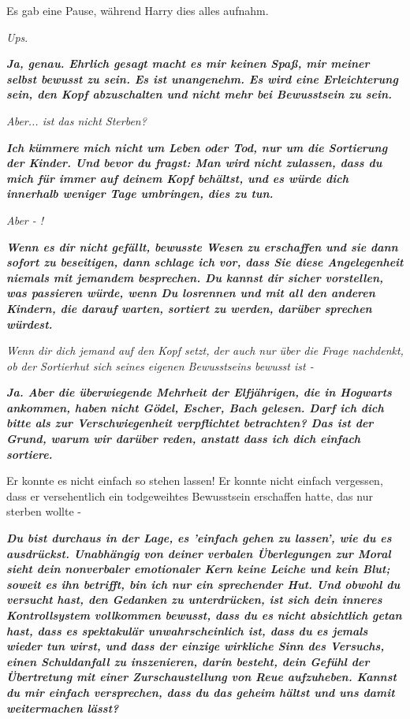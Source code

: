 Es gab eine Pause, während Harry dies alles aufnahm.

\emph{Ups}.

\textbf{\emph{\glqq{}Ja, genau. Ehrlich gesagt macht es mir keinen Spaß, mir
meiner selbst bewusst zu sein. Es ist unangenehm. Es wird eine Erleichterung
sein, den Kopf abzuschalten und nicht mehr bei Bewusstsein zu sein.\grqq{}}}

\emph{Aber... ist das nicht Sterben?}

\textbf{\emph{\glqq{}Ich kümmere mich nicht um Leben oder Tod, nur um die
Sortierung der Kinder. Und bevor du fragst: Man wird nicht zulassen, dass du
mich für immer auf deinem Kopf behältst, und es würde dich innerhalb weniger
Tage umbringen, dies zu tun.\grqq{}}}

\emph{Aber - !}

\textbf{\emph{\glqq{}Wenn es dir nicht gefällt, bewusste Wesen zu erschaffen und
sie dann sofort zu beseitigen, dann schlage ich vor, dass Sie diese
Angelegenheit niemals mit jemandem besprechen. Du kannst dir sicher vorstellen,
was passieren würde, wenn Du losrennen und mit all den anderen Kindern, die
darauf warten, sortiert zu werden, darüber sprechen würdest.\grqq{}}}

\emph{Wenn dir dich jemand auf den Kopf setzt, der auch nur über die Frage
nachdenkt, ob der Sortierhut sich seines eigenen Bewusstseins bewusst ist -}

\textbf{\emph{\glqq{}Ja. Aber die überwiegende Mehrheit der Elfjährigen, die in
Hogwarts ankommen, haben nicht Gödel, Escher, Bach gelesen. Darf ich dich bitte
als zur Verschwiegenheit verpflichtet betrachten? Das ist der Grund, warum wir
darüber reden, anstatt dass ich dich einfach sortiere.\grqq{}}}

Er konnte es nicht einfach so stehen lassen! Er konnte nicht einfach vergessen,
dass er versehentlich ein todgeweihtes Bewusstsein erschaffen hatte, das nur
sterben wollte -

\textbf{\emph{\glqq{}Du bist durchaus in der Lage, es 'einfach gehen zu lassen',
wie du es ausdrückst. Unabhängig von deiner verbalen Überlegungen zur Moral
sieht dein nonverbaler emotionaler Kern keine Leiche und kein Blut; soweit es
ihn betrifft, bin ich nur ein sprechender Hut. Und obwohl du versucht hast, den
Gedanken zu unterdrücken, ist sich dein inneres Kontrollsystem vollkommen
bewusst, dass du es nicht absichtlich getan hast, dass es spektakulär
unwahrscheinlich ist, dass du es jemals wieder tun wirst, und dass der einzige
wirkliche Sinn des Versuchs, einen Schuldanfall zu inszenieren, darin besteht,
dein Gefühl der Übertretung mit einer Zurschaustellung von Reue aufzuheben.
Kannst du mir einfach versprechen, dass du das geheim hältst und uns damit
weitermachen lässt?\grqq{}}}

